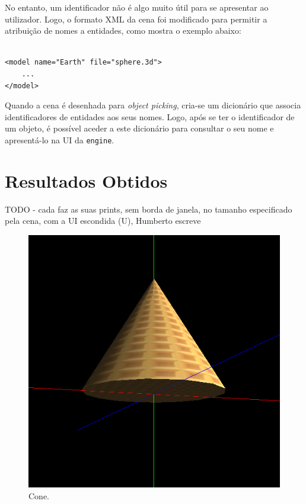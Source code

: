 \documentclass[12pt, a4paper]{article}
\begin{document}
No entanto, um identificador não é algo muito útil para se apresentar ao utilizador. Logo, o formato
XML da cena foi modificado para permitir a atribuição de nomes a entidades, como mostra o exemplo
abaixo:

\begin{lstlisting}

<model name="Earth" file="sphere.3d">
    ...
</model>
\end{lstlisting}

Quando a cena é desenhada para \emph{object picking}, cria-se um dicionário que associa
identificadores de entidades aos seus nomes. Logo, após se ter o identificador de um objeto, é
possível aceder a este dicionário para consultar o seu nome e apresentá-lo na UI da \texttt{engine}.

\section{Resultados Obtidos}

{\color{red} TODO - cada faz as suas prints, sem borda de janela, no tamanho especificado pela cena,
com a UI escondida (U), Humberto escreve}

\begin{figure}[H]
    \centering
    \includegraphics[width=\textwidth]{res/phase4/Cone.png}
    \caption{Cone.}
\end{figure}
\end{document}
